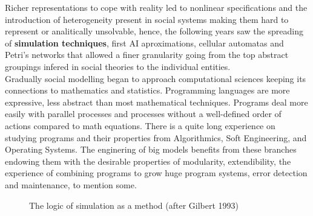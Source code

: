 \documentclass{report}
\begin{document}
Richer representations to cope with reality led to nonlinear specifications and the introduction of heterogeneity present in social systems making them hard to represent or analitically unsolvable, hence, the following years saw the spreading of \textbf{simulation techniques}, first AI aproximations, cellular automatas and Petri's networks that allowed a finer granularity going from the top abstract groupings infered in social theories to the individual entities.\\

Gradually social modelling began to approach computational sciences keeping its connections to mathematics and statistics. Programming languages are more expressive, less abstract than most mathematical techniques. Programs deal more easily with parallel processes and processes without a well-defined order of actions compared to math equations. There is a quite long experience on studying programs and their properties from Algorithmics, Soft Engineering, and Operating Systems. The enginering of big models benefits from these branches endowing them with the desirable properties of modularity, extendibility, the experience of combining programs to grow huge program systems, error detection and maintenance, to mention some.

\begin{figure}[tp]
\setlength\fboxsep{0pt}
\setlength\fboxrule{0.5pt}
\caption{The logic of simulation as a method (after Gilbert 1993)}
\label{fig:SimTL}
\end{figure}
\end{document}
